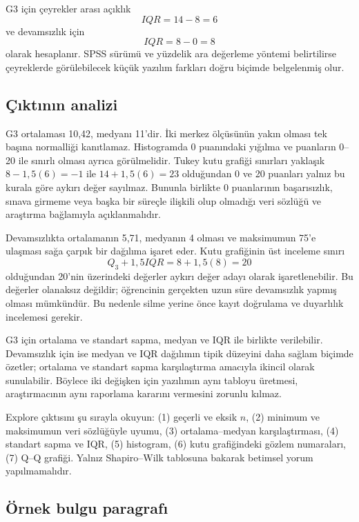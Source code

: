 G3 için çeyrekler arası açıklık
\[
IQR=14-8=6
\]
ve devamsızlık için
\[
IQR=8-0=8
\]
olarak hesaplanır. SPSS sürümü ve yüzdelik ara değerleme yöntemi belirtilirse
çeyreklerde görülebilecek küçük yazılım farkları doğru biçimde belgelenmiş
olur.

\subsection{Çıktının analizi}

G3 ortalaması 10,42, medyanı 11'dir. İki merkez ölçüsünün yakın olması tek
başına normalliği kanıtlamaz. Histogramda 0 puanındaki yığılma ve puanların
0--20 ile sınırlı olması ayrıca görülmelidir. Tukey kutu grafiği sınırları
yaklaşık $8-1{,}5(6)=-1$ ile $14+1{,}5(6)=23$ olduğundan 0 ve 20 puanları
yalnız bu kurala göre aykırı değer sayılmaz. Bununla birlikte 0 puanlarının
başarısızlık, sınava girmeme veya başka bir süreçle ilişkili olup olmadığı veri
sözlüğü ve araştırma bağlamıyla açıklanmalıdır.

Devamsızlıkta ortalamanın 5,71, medyanın 4 olması ve maksimumun 75'e ulaşması
sağa çarpık bir dağılıma işaret eder. Kutu grafiğinin üst inceleme sınırı
\[
Q_3+1{,}5IQR=8+1{,}5(8)=20
\]
olduğundan 20'nin üzerindeki değerler aykırı değer adayı olarak işaretlenebilir.
Bu değerler olanaksız değildir; öğrencinin gerçekten uzun süre devamsızlık
yapmış olması mümkündür. Bu nedenle silme yerine önce kayıt doğrulama ve
duyarlılık incelemesi gerekir.

G3 için ortalama ve standart sapma, medyan ve IQR ile birlikte verilebilir.
Devamsızlık için ise medyan ve IQR dağılımın tipik düzeyini daha sağlam biçimde
özetler; ortalama ve standart sapma karşılaştırma amacıyla ikincil olarak
sunulabilir. Böylece iki değişken için yazılımın aynı tabloyu üretmesi,
araştırmacının aynı raporlama kararını vermesini zorunlu kılmaz.

\begin{outputguidebox}
Explore çıktısını şu sırayla okuyun: (1) geçerli ve eksik $n$, (2) minimum ve
maksimumun veri sözlüğüyle uyumu, (3) ortalama--medyan karşılaştırması,
(4) standart sapma ve IQR, (5) histogram, (6) kutu grafiğindeki gözlem
numaraları, (7) Q--Q grafiği. Yalnız Shapiro--Wilk tablosuna bakarak betimsel
yorum yapılmamalıdır.
\end{outputguidebox}

\subsection{Örnek bulgu paragrafı}

